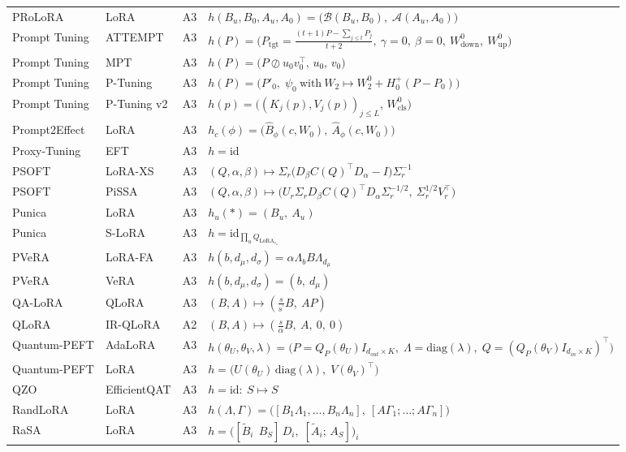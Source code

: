 \begin{longtable}{@{}>{\raggedright\arraybackslash}p{2.4cm}>{\raggedright\arraybackslash}p{2.4cm}c>{\raggedright\arraybackslash}p{8.6cm}@{}}
PRoLoRA & LoRA & A3 & $h(B_u,B_0,A_u,A_0)=\big(\mathcal B(B_u,B_0),\;\mathcal A(A_u,A_0)\big)$\\
Prompt Tuning & ATTEMPT & A3 & $h(P)=\Big(P_{\mathrm{tgt}}=\tfrac{(t+1)P-\sum_{j\le t}P_j}{t+2},\ \gamma=0,\ \beta=0,\ W^0_{\mathrm{down}},\ W^0_{\mathrm{up}}\Big)$\\
Prompt Tuning & MPT & A3 & $h(P)=\big(P\oslash u_0v_0^\top,\,u_0,\,v_0\big)$\\
Prompt Tuning & P-Tuning & A3 & $h(P)=\big(P'_0,\;\psi_0\ \text{with}\ W_2\mapsto W_2^0+H_0^{+}(P-P_0)\big)$\\
Prompt Tuning & P-Tuning v2 & A3 & $h(p)=\big((K_j(p),V_j(p))_{j\le L},\,W^0_{\mathrm{cls}}\big)$\\
Prompt2Effect & LoRA & A3 & $h_c(\phi)=\big(\hat B_\phi(c,W_0),\ \hat A_\phi(c,W_0)\big)$\\
Proxy-Tuning & EFT & A3 & $h=\mathrm{id}$\\
PSOFT & LoRA-XS & A3 & $(Q,\alpha,\beta)\mapsto\Sigma_r\big(D_\beta C(Q)^\top D_\alpha-I\big)\Sigma_r^{-1}$\\
PSOFT & PiSSA & A3 & $(Q,\alpha,\beta)\mapsto\big(U_r\Sigma_rD_\beta C(Q)^\top D_\alpha\Sigma_r^{-1/2},\ \Sigma_r^{1/2}V_r^\top\big)$\\
Punica & LoRA & A3 & $h_u(\ast)=(B_u,\ A_u)$\\
Punica & S-LoRA & A3 & $h=\mathrm{id}_{\prod_uQ_{\mathrm{LoRA}_{r_u}}}$\\
PVeRA & LoRA-FA & A3 & $h(b,d_\mu,d_\sigma)=\alpha\Lambda_bB\Lambda_{d_\mu}$\\
PVeRA & VeRA & A3 & $h(b,d_\mu,d_\sigma)=(b,\ d_\mu)$\\
QA-LoRA & QLoRA & A3 & $(B,A)\mapsto(\tfrac{s}{s^\prime}B,\ AP)$\\
QLoRA & IR-QLoRA & A2 & $(B,A)\mapsto(\tfrac{s}{\alpha}B,\ A,\ 0,\ 0)$\\
Quantum-PEFT & AdaLoRA & A3 & $h(\theta_U,\theta_V,\lambda)=\big(P=Q_P(\theta_U)I_{d_{out}\times K},\;\Lambda=\mathrm{diag}(\lambda),\;Q=(Q_P(\theta_V)I_{d_{in}\times K})^\top\big)$\\
Quantum-PEFT & LoRA & A3 & $h=\big(U(\theta_U)\,\mathrm{diag}(\lambda),\;V(\theta_V)^\top\big)$\\
QZO & EfficientQAT & A3 & $h=\mathrm{id}:\ S\mapsto S$\\
RandLoRA & LoRA & A3 & $h(\Lambda,\Gamma)=\big([B_1\Lambda_1,\dots,B_n\Lambda_n],\ [A\Gamma_1;\dots;A\Gamma_n]\big)$\\
RaSA & LoRA & A3 & $h=\big([\tilde B_i\ \ B_S]\,D_i,\;[\tilde A_i;\,A_S]\big)_i$\\

\end{longtable}
